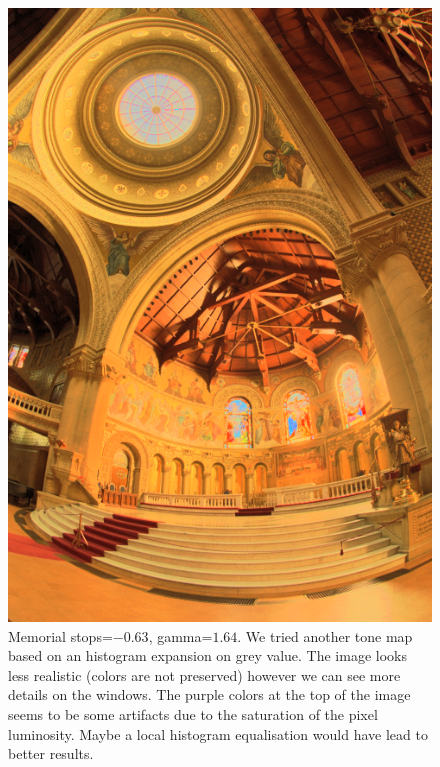 \documentclass[a4paper,12pt,oneside,final]{report}
\begin{document}
\begin{figure}[!h]
\centering
\includegraphics[scale=0.7]{pictures/hist_stops_-063_gamma_164.png}
\caption{Memorial stops=$-0.63$, gamma=$1.64$. We tried another tone map based  on an histogram expansion on grey value. The image looks less realistic (colors are not preserved) however we can see more details on the windows. The purple colors at the top of the image seems to be some artifacts due to the saturation of the pixel luminosity. Maybe a local histogram equalisation would have lead to better results.}
\end{figure}
\end{document}
